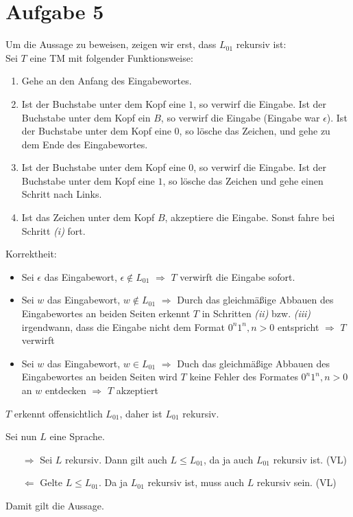 \documentclass[a4paper,11pt]{scrartcl}
\begin{document}
	\section*{Aufgabe 5}
	Um die Aussage zu beweisen, zeigen wir erst, dass $L_{01}$ rekursiv ist:\\
	Sei $T$ eine TM mit folgender Funktionsweise:
	\begin{enumerate}
	\item Gehe an den Anfang des Eingabewortes.
	\item Ist der Buchstabe unter dem Kopf eine $1$, so verwirf die Eingabe. Ist der Buchstabe unter dem Kopf ein $B$, so verwirf die Eingabe (Eingabe war $\epsilon$). Ist der Buchstabe unter dem Kopf eine $0$, so lösche das Zeichen, und gehe zu dem Ende des Eingabewortes.
	\item Ist der Buchstabe unter dem Kopf eine $0$, so verwirf die Eingabe. Ist der Buchstabe unter dem Kopf eine $1$, so lösche das Zeichen und gehe einen Schritt nach Links.
	\item Ist das Zeichen unter dem Kopf $B$, akzeptiere die Eingabe. Sonst fahre bei Schritt \textit{(i)} fort.
	\end{enumerate}
	Korrektheit:
	\begin{itemize}
	\item Sei $\epsilon$ das Eingabewort, $\epsilon \not\in L_{01}$ $\Rightarrow$ $T$ verwirft die Eingabe sofort.
	\item Sei $w$ das Eingabewort, $w \not\in L_{01}$ $\Rightarrow$ Durch das gleichmäßige Abbauen des Eingabewortes an beiden Seiten erkennt $T$ in Schritten \textit{(ii)} bzw. \textit{(iii)} irgendwann, dass die Eingabe nicht dem Format $0^n1^n, n>0$ entspricht $\Rightarrow$ $T$ verwirft
	\item Sei $w$ das Eingabewort, $w \in L_{01}$ $\Rightarrow$ Duch das gleichmäßige Abbauen des Eingabewortes an beiden Seiten wird $T$ keine Fehler des Formates $0^n1^n, n>0$ an $w$ entdecken $\Rightarrow$ $T$ akzeptiert
	\end{itemize}
	$T$ erkennt offensichtlich $L_{01}$, daher ist $L_{01}$ rekursiv.	
	
	Sei nun $L$ eine Sprache.
	\begin{itemize}
	\item[$\Rightarrow$] Sei $L$ rekursiv. Dann gilt auch $L \leq L_{01}$, da ja auch $L_{01}$ rekursiv ist. (VL)
	\item[$\Leftarrow$] Gelte $L \leq L_{01}$. Da ja $L_{01}$ rekursiv ist, muss auch $L$ rekursiv sein. (VL)
	\end{itemize}
	Damit gilt die Aussage.
	
\end{document}
